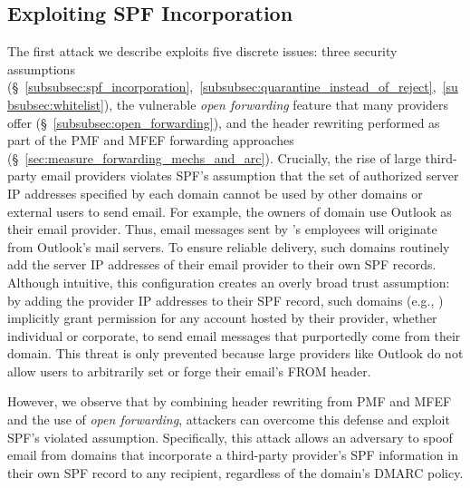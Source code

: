 \subsection{Exploiting SPF Incorporation}
\label{subsec:attack_open_forwarding}

The first attack we describe exploits five discrete issues:
three security assumptions (\S~\ref{subsubsec:spf_incorporation},~\ref{subsubsec:quarantine_instead_of_reject},~\ref{subsubsec:whitelist}),
the vulnerable \emph{open forwarding} feature that many providers offer (\S~\ref{subsubsec:open_forwarding}),
and the header rewriting performed as part of the PMF and MFEF forwarding approaches (\S~\ref{sec:measure_forwarding_mechs_and_arc}).
Crucially,
the rise of large third-party email providers violates SPF's assumption that the set of authorized server IP addresses specified by each domain cannot be used by other domains or external users to send email.
For example, the owners of domain  use Outlook as their email provider.  Thus, email messages sent by 's employees will originate from Outlook's mail servers.
To ensure reliable delivery, such domains routinely add the server IP addresses of their email provider to their own SPF records.
Although intuitive, this configuration creates an overly broad trust assumption: by adding the provider IP addresses to their SPF record, such domains (e.g., ) implicitly grant permission for any account hosted by their provider, whether individual or corporate, to send email messages that purportedly come from their domain.
This threat is only prevented because large providers like Outlook do not allow users to arbitrarily set or forge their email's FROM header.

However, we observe that by combining header rewriting from PMF and MFEF and the use of \emph{open forwarding}, attackers can overcome this defense and exploit SPF's violated assumption.
Specifically, this attack allows an adversary to spoof email from domains that incorporate a third-party provider's SPF information in their own SPF record to any recipient, regardless of the domain's DMARC policy.

